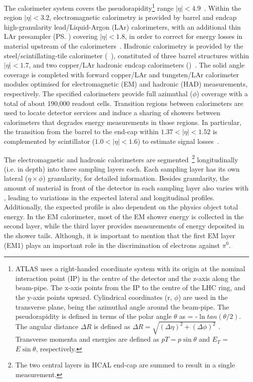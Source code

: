 The calorimeter system covers the pseudorapidity\footnote{ATLAS uses a right-handed coordinate system with its origin at the nominal interaction point (IP) in the centre of the detector and the z-axis along the beam-pipe. The x-axis points from the IP to the centre of the LHC ring, and the y-axis points upward. Cylindrical coordinates (r, $\phi$) are used in the transverse plane, \phi being the azimuthal angle around the beam-pipe. The pseudorapidity is defined in terms of the polar angle $\theta$ as \eta = -$\ln{tan(\theta/2)}$. The angular distance $\Delta R$ is defined as $\Delta R = \sqrt{(\Delta\eta)^{2} + (\Delta\phi)^{2}}$ . Transverse momenta and energies are defined as $pT = p\sin\theta$ and $E_{T}$ = $E\sin\theta$, respectively.} range \(|\eta| < 4.9\)~\cite{PERF-2007-01}. Within the region \(|\eta|< 3.2\),
electromagnetic calorimetry is provided by barrel and endcap high-granularity
lead/Liquid-Argon (LAr) calorimeters, with an additional thin LAr presampler
(\ps) covering \(|\eta| < 1.8\), in order to correct for energy losses in
material upstream of the calorimeters~\cite{LARG-2009-01,larg_tdr}. Hadronic
calorimetry is provided by the steel/scintillating-tile calorimeter
(\tilecal~\cite{TCAL-2017-01,tile_tdr}), constituted of three barrel structures
within \(|\eta| < 1.7\), and two copper/LAr hadronic endcap calorimeters
(\hec)~\cite{cal_tdr}.  The solid angle coverage is completed with forward
copper/LAr and tungsten/LAr calorimeter modules optimised for electromagnetic
(EM) and hadronic (HAD) measurements, respectively. The specified calorimeters
provide full azimuthal ($\phi$) coverage with a total of about 190,000 readout cells. Transition regions between calorimeters are used to locate detector services and induce a sharing of showers between calorimeters that degrades energy measurements in those regions. In particular, the transition from the barrel to the end-cap within
$1.37<|\eta|<1.52$ is complemented by scintillator ($1.0<|\eta|<1.6$) to
estimate signal losses~\cite{cal_tdr}.

The electromagnetic and hadronic calorimeters are segmented~\cite{PERF-2007-01}\footnote{The two
central layers in HCAL end-cap are summed to result in a single measurement.} longitudinally (i.e. in depth) into three sampling layers each. Each sampling layer has its own lateral ($\eta\times\phi$) granularity, for detailed information. Besides granularity, the amount of material in front of the detector in each sampling layer also varies with \abseta, leading to variations in the expected lateral and longitudinal profiles. Additionally, the expected
profile is also dependent on the physics object total energy. In the EM calorimeter, most of the EM shower energy is collected in the second layer, while the third layer provides measurements
of energy deposited in the shower tails. Although, it is important to mention that the first EM layer (EM1) plays an important role in the discrimination of electrons against $\pi^0$. 

